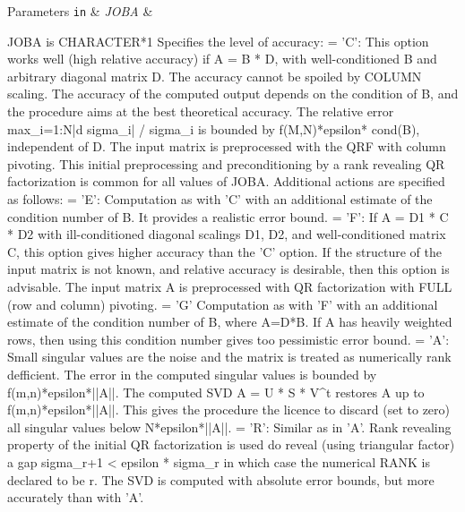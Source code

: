 \begin{DoxyParams}[1]{Parameters}
\mbox{\tt in}  & {\em J\+O\+B\+A} & \begin{DoxyVerb}          JOBA is CHARACTER*1
        Specifies the level of accuracy:
       = 'C': This option works well (high relative accuracy) if A = B * D,
             with well-conditioned B and arbitrary diagonal matrix D.
             The accuracy cannot be spoiled by COLUMN scaling. The
             accuracy of the computed output depends on the condition of
             B, and the procedure aims at the best theoretical accuracy.
             The relative error max_{i=1:N}|d sigma_i| / sigma_i is
             bounded by f(M,N)*epsilon* cond(B), independent of D.
             The input matrix is preprocessed with the QRF with column
             pivoting. This initial preprocessing and preconditioning by
             a rank revealing QR factorization is common for all values of
             JOBA. Additional actions are specified as follows:
       = 'E': Computation as with 'C' with an additional estimate of the
             condition number of B. It provides a realistic error bound.
       = 'F': If A = D1 * C * D2 with ill-conditioned diagonal scalings
             D1, D2, and well-conditioned matrix C, this option gives
             higher accuracy than the 'C' option. If the structure of the
             input matrix is not known, and relative accuracy is
             desirable, then this option is advisable. The input matrix A
             is preprocessed with QR factorization with FULL (row and
             column) pivoting.
       = 'G'  Computation as with 'F' with an additional estimate of the
             condition number of B, where A=D*B. If A has heavily weighted
             rows, then using this condition number gives too pessimistic
             error bound.
       = 'A': Small singular values are the noise and the matrix is treated
             as numerically rank defficient. The error in the computed
             singular values is bounded by f(m,n)*epsilon*||A||.
             The computed SVD A = U * S * V^t restores A up to
             f(m,n)*epsilon*||A||.
             This gives the procedure the licence to discard (set to zero)
             all singular values below N*epsilon*||A||.
       = 'R': Similar as in 'A'. Rank revealing property of the initial
             QR factorization is used do reveal (using triangular factor)
             a gap sigma_{r+1} < epsilon * sigma_r in which case the
             numerical RANK is declared to be r. The SVD is computed with
             absolute error bounds, but more accurately than with 'A'.\end{DoxyVerb}

\end{DoxyParams}
